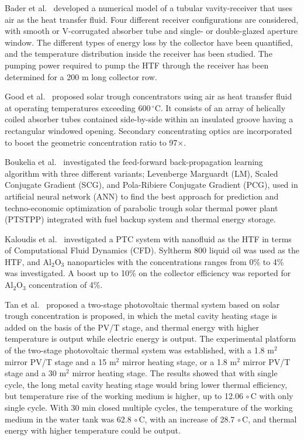 Bader et al.~\cite{Bader2015} developed a numerical model of a tubular vavity-receiver that uses air as the heat transfer fluid. Four different receiver configurations are considered, with smooth or V-corrugated absorber tube and single- or double-glazed aperture window. The different types of energy loss by the collector have been quantified, and the temperature distribution inside the receiver has been studied. The pumping power required to pump the HTF through the receiver has been determined for a 200 m long collector row.

Good et al.~\cite{Good2015} proposed solar trough concentrators using air as heat transfer fluid at operating temperatures exceeding $600\,^\circ$C. It consists of an array of helically coiled absorber tubes contained side-by-side within an insulated groove having a rectangular windowed opening. Secondary concentrating optics are incorporated to boost the geometric concentration ratio to 97$\times$.

Boukelia et al.~\cite{Boukelia2016} investigated the feed-forward back-propagation learning algorithm with three different variants; Levenberge Marguardt (LM), Scaled Conjugate Gradient (SCG), and Pola-Ribiere Conjugate Gradient (PCG), used in artificial neural network (ANN) to find the best approach for prediction and techno-economic optimization of parabolic trough solar thermal power plant (PTSTPP) integrated with fuel backup system and thermal energy storage.

Kaloudis et al.~\cite{Kaloudis2016} investigated a PTC system with nanofluid as the HTF in terms of Computational Fluid Dynamics (CFD). Syltherm 800 liquid oil was used as the HTF, and Al$_2$O$_3$ nanoparticles with the concentrations ranges from 0\% to 4\% was investigated. A boost up to 10\% on the collector efficiency was reported for Al$_2$O$_3$ concentration of 4\%.

Tan et al.~\cite{Tan2014} proposed a two-stage photovoltaic thermal system based on solar trough concentration is proposed, in which the metal cavity heating stage is added on the basis of the PV/T stage, and thermal energy with higher temperature is output while electric energy is output. The experimental platform of the two-stage photovoltaic thermal system was established, with a 1.8 m$^2$ mirror PV/T stage and a 15 m$^2$ mirror heating stage, or a 1.8 m$^2$ mirror PV/T stage and a 30 m$^2$ mirror heating stage. The results showed that with single cycle, the long metal cavity heating stage would bring lower thermal efficiency, but temperature rise of the working medium is higher, up to 12.06$\,\circ$C with only single cycle. With 30 min closed multiple cycles, the temperature of the working medium in the water tank was 62.8$\,\circ$C, with an increase of 28.7$\,\circ$C, and thermal energy with higher temperature could be output.

